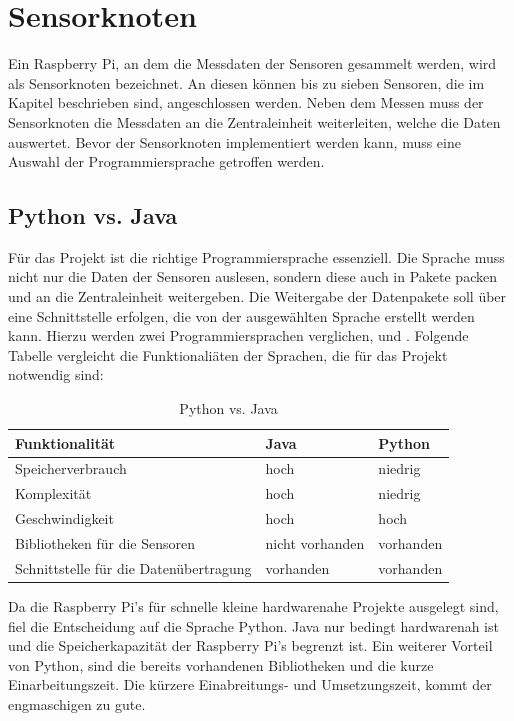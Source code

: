 \section{Sensorknoten}
Ein Raspberry Pi, an dem die Messdaten der Sensoren gesammelt werden, wird als Sensorknoten bezeichnet. An diesen können bis zu sieben Sensoren, die im Kapitel  beschrieben sind, angeschlossen werden. Neben dem Messen muss der Sensorknoten die Messdaten an die Zentraleinheit weiterleiten, welche die Daten auswertet. Bevor der Sensorknoten implementiert werden kann, muss eine Auswahl der Programmiersprache getroffen werden.
\subsection{Python vs. Java}
Für das Projekt ist die richtige Programmiersprache essenziell. Die Sprache muss nicht nur die Daten der Sensoren auslesen, sondern diese auch in Pakete packen und an die Zentraleinheit weitergeben. Die Weitergabe der Datenpakete soll über eine Schnittstelle erfolgen, die von der ausgewählten Sprache erstellt werden kann. Hierzu werden zwei Programmiersprachen verglichen,  und . Folgende Tabelle vergleicht die Funktionaliäten der Sprachen, die für das Projekt notwendig sind:\hfill

\begin{table}[h]
	\centering
	\caption{Python vs. Java}
	\label{tab:phytionvsjava}
	\begin{tabular}{l|l|l}
	\textbf{Funktionalität} & \textbf{Java} &\textbf{Python}   \\
	\hline
	 Speicherverbrauch & hoch & niedrig \\\hline
	Komplexität  & hoch & niedrig\\\hline
	Geschwindigkeit  & hoch & hoch \\\hline
	Bibliotheken für die Sensoren & nicht vorhanden & vorhanden \\\hline
	Schnittstelle für die Datenübertragung & vorhanden & vorhanden
	\end{tabular}
\end{table}
\noindent Da die Raspberry Pi's für schnelle kleine hardwarenahe Projekte ausgelegt sind, fiel die Entscheidung auf die Sprache Python. Java nur bedingt hardwarenah ist und die Speicherkapazität der Raspberry Pi's begrenzt ist. Ein weiterer Vorteil von Python, sind die bereits vorhandenen Bibliotheken und die kurze Einarbeitungszeit. Die kürzere Einabreitungs- und Umsetzungszeit, kommt der engmaschigen  zu gute. %

